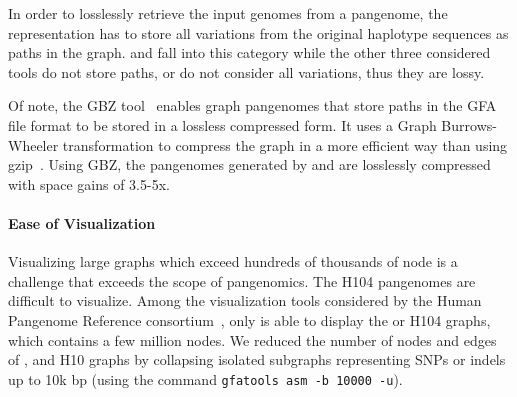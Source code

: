 In order to losslessly retrieve the input genomes from a pangenome, the  representation has to store all variations from the original haplotype sequences as paths in the graph. \pggb and \mcactus fall into this category while the other three considered tools do not store paths, or do not consider all variations, thus they are lossy.

Of note, the GBZ tool~\cite{gbz} enables graph pangenomes that store paths in the GFA file format %
to be stored in a lossless compressed form. It uses a Graph Burrows-Wheeler transformation to compress the graph in a more efficient way than using gzip~\cite{gbz}. Using GBZ, the pangenomes generated by \pggb and \mcactus are losslessly compressed with space gains of 3.5-5x.


\paragraph{\textbf{\textup{Ease of Visualization}}}
Visualizing large graphs which exceed hundreds of thousands of node is a challenge that exceeds the scope of pangenomics. The H104 pangenomes  are difficult to visualize.
Among the visualization tools considered by the Human Pangenome Reference consortium~\cite{hpp}, 
only \bandage is able to display the \minigraph or \mdbg H104 graphs, which contains a few million nodes. We reduced the number of nodes and edges of \pggb, \mcactus and \bifrost H10 graphs by collapsing isolated subgraphs representing SNPs or indels up to 10k bp (using the command \texttt{gfatools asm -b 10000 -u}). %


